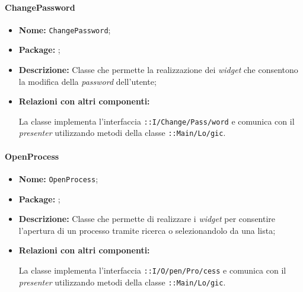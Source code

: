 \paragraph{ChangePassword}
\begin{flushleft}
\begin{itemize}
\item \textbf{Nome:} \texttt{ChangePassword};
\item \textbf{Package:} \texttt{\viewAdmin{}};
\item \textbf{Descrizione:} Classe che permette la realizzazione dei \textit{widget} che consentono la modifica della \textit{password} dell'utente;
\item \textbf{Relazioni con altri componenti:}
\begin{sloppypar}
La classe implementa l'interfaccia \texttt{\iViewUser{}::I\fshyp{}Change\fshyp{}Pass\fshyp{}word} e comunica con il \textit{presenter} utilizzando metodi della classe \texttt{\logicUser{}::Main\fshyp{}Lo\fshyp{}gic}.
\end{sloppypar}
\end{itemize}
\end{flushleft}

\paragraph{OpenProcess}
\begin{flushleft}
\begin{itemize}
\item \textbf{Nome:} \texttt{OpenProcess};
\item \textbf{Package:} \texttt{\viewAdmin{}};
\item \textbf{Descrizione:} Classe che permette di realizzare i \textit{widget} per consentire l'apertura di un processo tramite ricerca o selezionandolo da una lista;
\item \textbf{Relazioni con altri componenti:}
\begin{sloppypar}
La classe implementa l'interfaccia \texttt{\iViewUser{}::I\fshyp{}O\fshyp{}pen\fshyp{}Pro\fshyp{}cess} e comunica con il \textit{presenter} utilizzando metodi della classe \texttt{\logicUser{}::Main\fshyp{}Lo\fshyp{}gic}.
\end{sloppypar}
\end{itemize}
\end{flushleft}

